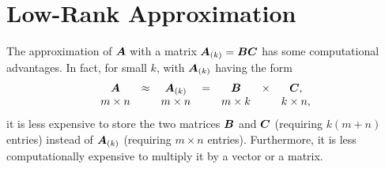 \documentclass[12pt]{article}
\begin{document}
\section{Low-Rank Approximation}
\label{sec:low}


The approximation of $\bm{A}$ with a matrix $\bm{A}_{(k)} = \bm{BC}$ has some computational advantages.
In fact, for small $k$, with $\bm{A}_{(k)}$ having the form
\begin{equation}
\label{eq:lowrank}
\begin{array}{ccccccccccc}
\bm{A} &\approx& \bm{A}_{(k)} &=& \bm{B} &\times& \bm{C},\\
m\times n && m\times n && m \times k && k\times n,
\end{array}
\end{equation}
it is less expensive to store the two matrices $\bm{B}$ and $\bm{C}$ (requiring $k(m+n)$ entries) instead of $\bm{A}_{(k)}$ (requiring $m \times n$ entries). Furthermore, it is less computationally expensive to multiply it by a vector or a matrix.



\end{document}
